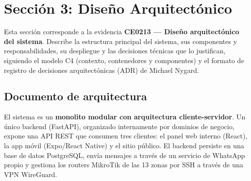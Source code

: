 \section{Sección 3: Diseño Arquitectónico}
\label{chap:ce02-arquitectura}

Esta sección corresponde a la evidencia \textbf{CE0213 — Diseño arquitectónico del
sistema}. Describe la estructura principal del sistema, sus componentes y
responsabilidades, su despliegue y las decisiones técnicas que lo justifican,
siguiendo el modelo C4 (contexto, contenedores y componentes) y el formato de registro
de decisiones arquitectónicas (ADR) de Michael Nygard.

\subsection{Documento de arquitectura}
\label{sec:ce02-doc-arq}

El sistema es un \textbf{monolito modular con arquitectura cliente-servidor}. Un
único backend (FastAPI), organizado internamente por dominios de negocio, expone una
API REST que consumen tres clientes: el panel web interno (React), la app móvil
(Expo/React Native) y el sitio público. El backend persiste en una base de datos
PostgreSQL, envía mensajes a través de un servicio de WhatsApp propio y gestiona los
routers MikroTik de las 13 zonas por SSH a través de una VPN WireGuard.

